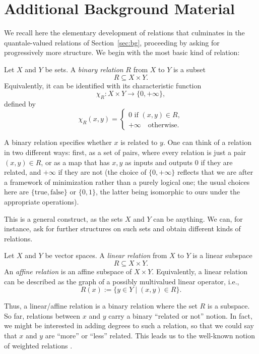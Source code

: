 \section{Additional Background Material}\label{app:background}

We recall here the elementary development of relations that culminates in
the quantale-valued relations of Section~\ref{sec:bg}, proceeding by asking
for progressively more structure. We begin with the most basic kind of
relation:

\begin{definition}\label{def:binaryrel}
	Let $X$ and $Y$ be sets. A \emph{binary relation} $R$ from $X$ to $Y$ is a subset
	\[
		R \subseteq X \times Y.
	\]
	Equivalently, it can be identified with its characteristic function
	\[
		\chi_R : X \times Y \to \{0,+\infty\},
	\]
	defined by
	\[
		\chi_R(x,y) =
		\begin{cases}
			0  \text{ if } (x,y) \in R, \\
			+\infty \quad \text{otherwise}.
		\end{cases}
	\]
\end{definition}

A binary relation specifies whether $x$ is related to $y$.
One can think of a relation in two different ways:
first, as a set of pairs, where every relation is just a pair $(x,y) \in R$,
or as a map that has $x,y$ as inputs and outputs $0$ if they are related, and $+\infty$ if they are not
(the choice of $\{0,+\infty\}$ reflects that we are after a framework of minimization rather than a purely logical one; the usual choices here are $\{\text{true},\text{false}\}$ or $\{0,1\}$, the latter being isomorphic to ours under the appropriate operations).

This is a general construct, as the sets $X$ and $Y$ can be anything.
We can, for instance, ask for further structures on such sets and obtain different kinds of relations.
\begin{definition}
	Let $X$ and $Y$ be vector spaces. A \emph{linear relation} from $X$ to $Y$ is a linear subspace
	\[
		R \subseteq X \times Y.
	\]
	An \emph{affine relation} is an affine subspace of $X \times Y$.
	Equivalently, a linear relation can be described as the graph of a possibly multivalued linear operator, i.e.,
	\[
		R(x) := \{ y \in Y \mid (x,y) \in R \}.
	\]
\end{definition}

Thus, a linear/affine relation is a binary relation where the set $R$ is a subspace.
So far, relations between $x$ and $y$ carry a binary ``related or not'' notion. In fact, we might be interested in adding degrees to such a relation, so that we could say that $x$ and $y$ are ``more'' or ``less'' related. This leads us to the well-known notion of weighted relations \cite{lawvere1973metric}.

